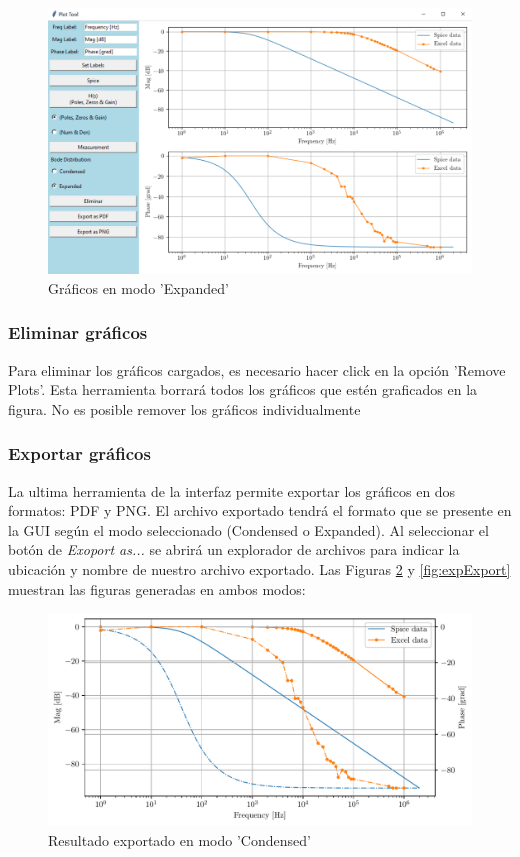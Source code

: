 \documentclass[10pt,a4paper]{article}
\begin{document}
\begin{figure}[ht]
\centering
\includegraphics[scale=0.15]{resources/expanded.png}
\caption{Gráficos en modo 'Expanded'}
\label{fig:expanded}
\end{figure}

\subsubsection{Eliminar gráficos}
Para eliminar los gráficos cargados, es necesario hacer click en la opción 'Remove Plots'. Esta herramienta borrará todos los gráficos que estén graficados en la figura. No es posible remover los gráficos individualmente

\subsubsection{Exportar gráficos}
La ultima herramienta de la interfaz permite exportar los gráficos en dos formatos: PDF y PNG. El archivo exportado tendrá el formato que se presente en la GUI según el modo seleccionado (Condensed o Expanded). Al seleccionar el botón de \emph{Exoport as...} se abrirá un explorador de archivos para indicar la ubicación y nombre de nuestro archivo exportado. Las Figuras \ref{fig:condExport} y \ref{fig:expExport} muestran las figuras generadas en ambos modos:

\begin{figure}[ht]
\centering
\includegraphics[scale=0.7]{resources/condExport.pdf}
\caption{Resultado exportado en modo 'Condensed'}
\label{fig:condExport}
\end{figure}
\end{document}
